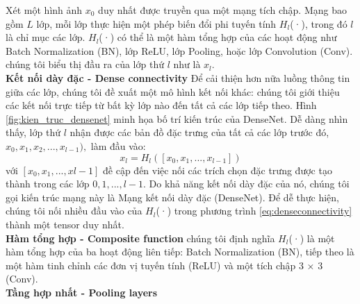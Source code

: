 Xét một hình ảnh $x_0$ duy nhất được truyền qua một mạng tích chập. Mạng bao gồm $L$ lớp, mỗi lớp thực hiện một phép biến đổi phi tuyến tính $H_l$(·), trong đó $l$ là chỉ mục các lớp. $H_l$(·) có thể là một hàm tổng hợp của các hoạt động như Batch Normalization (BN), lớp ReLU, lớp Pooling, hoặc lớp Convolution (Conv). chúng tôi biểu thị đầu ra của lớp thứ $l$ như là $x_l$.\\
{\bf Kết nối dày đặc - Dense connectivity}
Để cải thiện hơn nữa luồng thông tin giữa các lớp, chúng tôi đề xuất một mô hình kết nối khác: chúng tôi giới thiệu các kết nối trực tiếp từ bất kỳ lớp nào đến tất cả các lớp tiếp theo. Hình \ref{fig:kien_truc_densenet} minh họa bố trí kiến trúc của DenseNet. Dễ dàng nhìn thấy, lớp thứ $l$ nhận được các bản đồ đặc trưng của tất cả các lớp trước đó, $x_0, x_1, x_2, . . . , x_{l-1}),$ làm đầu vào:
\begin{equation}\label{eq:denseconnectivity}
	x_l = H_l([x_0, x_1, . . . , x_{l-1}])
\end{equation}
với $[x_0, x_1, . . . , x{l-1}]$ đề cập đến việc nối các trích chọn đặc trưng được tạo thành trong các lớp $0, 1, ..., {l-1}$. Do khả năng kết nối dày đặc của nó, chúng tôi gọi kiến trúc mạng này là Mạng kết nối dày đặc (DenseNet). Để dễ thực hiện, chúng tôi nối nhiều đầu vào của $H_l$(·) trong phương trình \ref{eq:denseconnectivity} thành một tensor duy nhất.\\
{\bf Hàm tổng hợp - Composite function}
chúng tôi định nghĩa $H_l$(·) là một hàm tổng hợp của ba hoạt động liên tiếp: Batch Normalization (BN), tiếp theo là một hàm tinh chỉnh các đơn vị tuyến tính (ReLU) và một tích chập 3 × 3 (Conv).\\
{\bf Tầng hợp nhất - Pooling layers}
